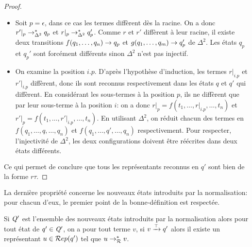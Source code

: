 \begin{proof}
  \begin{itemize}
  \item Soit $p = \epsilon$, dans ce cas les termes diffèrent dès la racine.
    On a donc $r'|_p \rightarrow^*_{\Delta^2} q_p$ et $r|_p \rightarrow^*_{\Delta^2} q'_p$. Comme $r$ et $r'$ diffèrent à leur racine,
    il existe deux transitions $f(q_1, \dots,q_n) \rightarrow q_p$ et $g(q_1, \dots,q_m) \rightarrow q_p'$ de $\Delta^2$. %
    Les états $q_p$ et $q_p'$ sont forcément différents sinon $\Delta^2$ n'est pas injectif. 
  \item On examine la position $i.p$. D'après l'hypothèse d'induction, les termes $r|_{i.p}$ et $r'|_{i.p}$ diffèrent, donc ils 
    sont reconnus respectivement dans les états $q$ et $q'$ qui diffèrent. En considérant les sous-termes à la position $p$,
    ils ne diffèrent que par leur sous-terme à la position $i$: on a donc $r|_p = f(t_1, \dots, r|_{i.p},\dots,t_n)$ et $r'|_p = f(t_1, \dots, r'|_{i.p},\dots,t_n)$.
    En utilisant $\Delta^2$, on réduit chacun des termes en $f(q_1, \dots, q, \dots, q_n)$ et $f(q_1, \dots, q', \dots, q_n)$ respectivement.
    Pour respecter, l'injectivité de $\Delta^2$, les deux configurations doivent être réécrites dans deux états différents.
  \end{itemize}
  Ce qui permet de conclure que tous les représentants reconnus en $q'$ sont bien de la forme $r\tau$.
\end{proof}


La dernière propriété concerne les nouveaux états introduits par la normalisation: pour chacun d'eux,
le premier point de la bonne-définition est respectée.
\begin{property}
  \label{prop:norm_well_def}
  Si $\mathit Q'$ est l'ensemble des nouveaux états introduits par la normalisation alors pour tout état de $q'\in \mathit Q'$,
  on a pour tout terme $v$, si $v \xrightarrow{\top} q'$ alors il existe un représentant $u \in \mathcal R ep(q')$ tel que 
  $u \rightarrow^*_\mathcal R v$.
\end{property}

